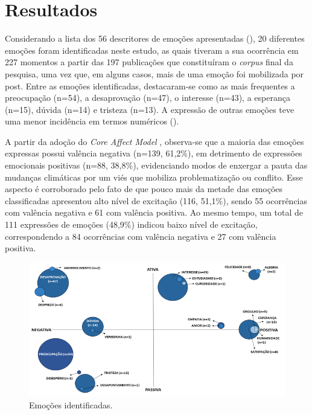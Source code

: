 \documentclass[portuguese]{textolivre}
\begin{document}
\section{Resultados}\label{sec-organizacao}
Considerando a lista dos 56 descritores de emoções apresentadas (), 20 diferentes emoções foram identificadas neste estudo, as quais tiveram a sua ocorrência em 227 momentos a partir das 197 publicações que constituíram o \textit{corpus} final da pesquisa, uma vez que, em alguns casos, mais de uma emoção foi mobilizada por post. Entre as emoções identificadas, destacaram-se como as mais frequentes a preocupação (n=54), a desaprovação (n=47), o interesse (n=43), a esperança (n=15), dúvida (n=14) e tristeza (n=13). A expressão de outras emoções teve uma menor incidência em termos numéricos ().

A partir da adoção do \textit{Core Affect Model} \cite{russell2003core}, observa-se que a maioria das emoções expressas possui valência negativa (n=139, 61,2\%), em detrimento de expressões emocionais positivas (n=88, 38,8\%), evidenciando modos de enxergar a pauta das mudanças climáticas por um viés que mobiliza problematização ou conflito. Esse aspecto é corroborado pelo fato de que pouco mais da metade das emoções classificadas apresentou alto nível de excitação (116, 51,1\%), sendo 55 ocorrências com valência negativa e 61 com valência positiva. Ao mesmo tempo, um total de 111 expressões de emoções (48,9\%) indicou baixo nível de excitação, correspondendo a 84 ocorrências com valência negativa e 27 com valência positiva.

\begin{figure}[h!]
    \centering
    \begin{minipage}{0.95\linewidth}
    \includegraphics[width=\linewidth]{Fig2.png}
    \caption{Emoções identificadas.}
    \label{fig2}
    \end{minipage}
\end{figure}
\end{document}
